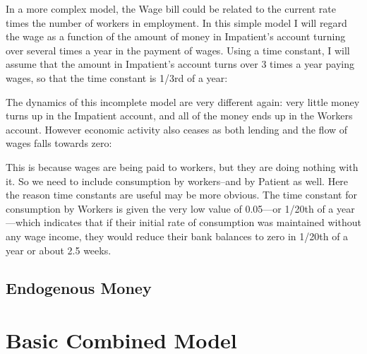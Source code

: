 In a more complex model, the Wage bill could be related to the current
rate times the number of workers in employment. In this simple model I
will regard the wage as a function of the amount of money in
Impatient's account turning over several times a year in the payment
of wages. Using a time constant, I will assume that the amount in
Impatient's account turns over 3 times a year paying wages, so that
the time constant is 1/3rd of a year:



The dynamics of this incomplete model are very different again: very
little money turns up in the Impatient account, and all of the money
ends up in the Workers account. However economic activity also ceases
as both lending and the flow of wages falls towards zero:



This is because wages are being paid to workers, but they are doing
nothing with it. So we need to include consumption by workers--and by
Patient as well. Here the reason time constants are useful may be more
obvious. The time constant for consumption by Workers is given the
very low value of 0.05---or 1/20th of a year---which indicates that if
their initial rate of consumption was maintained without any wage
income, they would reduce their bank balances to zero in 1/20th of a
year or about 2.5 weeks.

\subsection{Endogenous Money}\label{tut:money}

\section{Basic Combined Model}


